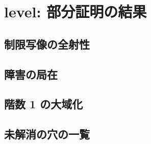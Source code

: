 
\section{level: 部分証明の結果}

\subsection{制限写像の全射性}

\subsection{障害の局在}

\subsection{階数 1 の大域化}

\subsection{未解消の穴の一覧}
